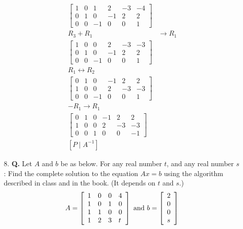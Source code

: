 \documentclass[main.tex]{subfiles}
\begin{document}
\begin{enumerate}
    $$
    \begin{aligned}
        \left[\begin{array}{ccc|ccc}
    1 & 0 & 1 & 2 & -3 & -4 \\
    0 & 1 & 0 & -1 & 2 & 2 \\
    0 & 0 & -1 & 0 & 0 & 1
    \end{array}\right]&\\
    R_3 + R_1 & \rightarrow R_1\\
    \left[\begin{array}{ccc|ccc}
    1 & 0 & 0 & 2 & -3 & -3 \\
    0 & 1 & 0 & -1 & 2 & 2 \\
    0 & 0 & -1 & 0 & 0 & 1
    \end{array}\right]&\\
    R_1 \leftrightarrow R_2& \\
    \left[\begin{array}{ccc|ccc}
    0 & 1 & 0 & -1 & 2 & 2 \\
    1 & 0 & 0 & 2 & -3 & -3 \\
    0 & 0 & -1 & 0 & 0 & 1
    \end{array}\right]&\\
    -R_1 \rightarrow R_1& \\
    \left[\begin{array}{ccc|ccc}
    0 & 1 & 0 & -1 & 2 & 2 \\
    1 & 0 & 0 & 2 & -3 & -3 \\
    0 & 0 & 1 & 0 & 0 & -1
    \end{array}\right]&\\
    [P \mid A^{-1}]&
    \end{aligned}
    $$
    
\item[8.] \textbf{Q.} Let $A$ and $b$ be as below. For any real number $t$, and any real number $s$ : Find the complete solution to the equation $A x=b$ using the algorithm described in class and in the book. (It depends on $t$ and $s$.)
    $$
    A=\left[\begin{array}{llll}
    1 & 0 & 0 & 4 \\
    1 & 0 & 1 & 0 \\
    1 & 1 & 0 & 0 \\
    1 & 2 & 3 & t
    \end{array}\right] \text { and } b=\left[\begin{array}{l}
    2 \\
    0 \\
    0 \\
    s
    \end{array}\right]\\
    $$
    

\end{enumerate}
\end{document}
